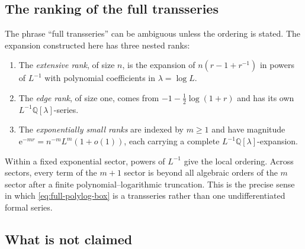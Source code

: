 \documentclass[11pt,a4paper]{article}
\theoremstyle{definition}
\theoremstyle{remark}
\newcommand{\Q}{\mathbb Q}
\newcommand{\ee}{\mathrm e}
\begin{document}
\subsection{The ranking of the full transseries}

The phrase ``full transseries'' can be ambiguous unless the ordering is stated.
The expansion constructed here has three nested ranks:
\begin{enumerate}[label=\arabic*.,leftmargin=2.1em,itemsep=3pt]
 \item The \emph{extensive rank}, of size \(n\), is the expansion of
       \(n(r-1+r^{-1})\) in powers of \(L^{-1}\) with polynomial
       coefficients in \(\lambda=\log L\).
 \item The \emph{edge rank}, of size one, comes from
       \(-1-\tfrac12\log(1+r)\) and has its own
       \(L^{-1}\Q[\lambda]\)-series.
 \item The \emph{exponentially small ranks} are indexed by \(m\ge1\) and have
       magnitude
       \(\ee^{-mr}=n^{-m}L^m(1+o(1))\), each carrying a complete
       \(L^{-1}\Q[\lambda]\)-expansion.
\end{enumerate}
Within a fixed exponential sector, powers of \(L^{-1}\) give the local
ordering.  Across sectors, every term of the \(m+1\) sector is beyond all
algebraic orders of the \(m\) sector after a finite polynomial--logarithmic
truncation.  This is the precise sense in which
\cref{eq:full-polylog-box} is a transseries rather than one undifferentiated
formal series.

\subsection{What is not claimed}
\end{document}

